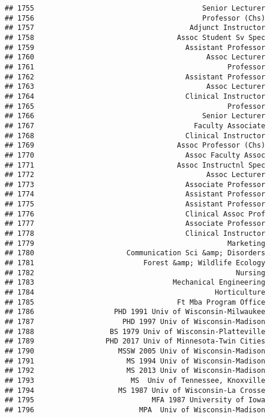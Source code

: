 \documentclass[
]{article}
\begin{document}
\begin{verbatim}
## 1755                                        Senior Lecturer
## 1756                                        Professor (Chs)
## 1757                                     Adjunct Instructor
## 1758                                  Assoc Student Sv Spec
## 1759                                    Assistant Professor
## 1760                                         Assoc Lecturer
## 1761                                              Professor
## 1762                                    Assistant Professor
## 1763                                         Assoc Lecturer
## 1764                                    Clinical Instructor
## 1765                                              Professor
## 1766                                        Senior Lecturer
## 1767                                      Faculty Associate
## 1768                                    Clinical Instructor
## 1769                                  Assoc Professor (Chs)
## 1770                                    Assoc Faculty Assoc
## 1771                                  Assoc Instructnl Spec
## 1772                                         Assoc Lecturer
## 1773                                    Associate Professor
## 1774                                    Assistant Professor
## 1775                                    Assistant Professor
## 1776                                    Clinical Assoc Prof
## 1777                                    Associate Professor
## 1778                                    Clinical Instructor
## 1779                                              Marketing
## 1780                      Communication Sci &amp; Disorders
## 1781                          Forest &amp; Wildlife Ecology
## 1782                                                Nursing
## 1783                                 Mechanical Engineering
## 1784                                           Horticulture
## 1785                                  Ft Mba Program Office
## 1786                   PHD 1991 Univ of Wisconsin-Milwaukee
## 1787                     PHD 1997 Univ of Wisconsin-Madison
## 1788                  BS 1979 Univ of Wisconsin-Platteville
## 1789                 PHD 2017 Univ of Minnesota-Twin Cities
## 1790                    MSSW 2005 Univ of Wisconsin-Madison
## 1791                      MS 1994 Univ of Wisconsin-Madison
## 1792                      MS 2013 Univ of Wisconsin-Madison
## 1793                       MS  Univ of Tennessee, Knoxville
## 1794                    MS 1987 Univ of Wisconsin-La Crosse
## 1795                            MFA 1987 University of Iowa
## 1796                         MPA  Univ of Wisconsin-Madison

\end{verbatim}
\end{document}
